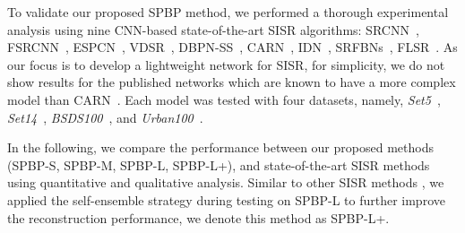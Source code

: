 \documentclass[a4paper,11pt]{article}
\begin{document}
To validate our proposed SPBP method, we performed a thorough experimental analysis using nine CNN-based state-of-the-art SISR algorithms: SRCNN~\cite{SRCNN}, FSRCNN~\cite{FSRCNN}, ESPCN~\cite{ESPCN}, VDSR~\cite{VDSR}, DBPN-SS~\cite{DBPN}, CARN~\cite{CARN}, IDN~\cite{IDN}, SRFBNs~\cite{SRFBN}, FLSR~\cite{FLSR}. As our focus is to develop a lightweight network for SISR, for simplicity, we do not show results for the published networks which are known to have a more complex model than CARN~\cite{CARN}. Each model was tested with four datasets, namely, \textit{Set5}~\cite{Yang_image}, \textit{Set14}~\cite{set14}, \textit{BSDS100}~\cite{arbelaez2010contour}, and \textit{Urban100}~\cite{Urban}.




















In the following, we compare the performance between our proposed methods (SPBP-S, SPBP-M, SPBP-L, SPBP-L+), and state-of-the-art SISR methods using quantitative and qualitative analysis. Similar to other SISR methods \cite{EDSR, SRFBN, FLSR}, we applied the self-ensemble strategy during testing on SPBP-L to further improve the reconstruction performance, we denote this method as SPBP-L+.
\end{document}
